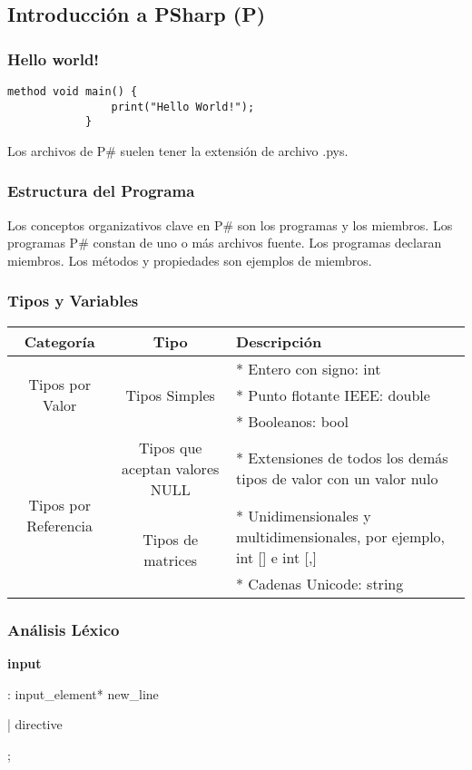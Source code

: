 \subsection{Introducción a PSharp (P)}
	\subsubsection{Hello world!}
	
		\begin{lstlisting}[language={PSharp}, label={Hello World!}]
			method void main() {
				print("Hello World!");
			}
		\end{lstlisting}	
		Los archivos de P\# suelen tener la extensión de archivo .pys.
		
		
	\subsubsection{Estructura del Programa}
		Los conceptos organizativos clave en P\# son los programas y los miembros. Los programas P\# constan de uno o más archivos fuente. Los programas declaran miembros. Los métodos y propiedades son ejemplos de miembros.
		
	\subsubsection{Tipos y Variables}
		\begin{center}
			\begin{tabular}{| c | c | m{5cm} | }
				\hline
				Categoría & Tipo & Descripción \\ \hline
				\multirow{3}{*}{Tipos por Valor} & \multirow{3}{*}{Tipos Simples} & * Entero con signo: int \\
				 &  & * Punto flotante IEEE: double \\
				 &  & * Booleanos: bool \\ \hline
				\multirow{3}{*}{Tipos por Referencia} & Tipos que aceptan valores NULL & * Extensiones de todos los demás tipos de valor con un valor nulo \\
				 & \multirow{2}{*}{Tipos de matrices} & * Unidimensionales y multidimensionales, por ejemplo, int [] e int [,] \\
				 &  & * Cadenas Unicode: string \\ \hline
			\end{tabular}
		\end{center}
	\subsubsection{Análisis Léxico}
		\textbf{input}\par
		: input\_element* new\_line\par
		| directive\par
		;\par
		
